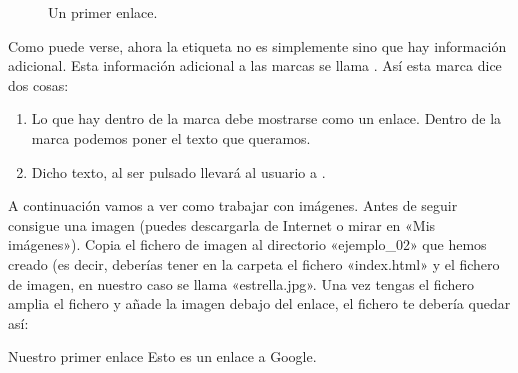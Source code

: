 \documentclass[a4paper,12pt,spanish]{sphinxmanual}
\begin{document}
\begin{figure}[htbp]
\centering
\capstart

\noindent{}
\caption{Un primer enlace.}\label{\detokenize{index:id14}}\end{figure}

Como puede verse, ahora la etiqueta no es simplemente  sino que hay información adicional. Esta información adicional a las marcas se llama . Así esta marca dice dos cosas:
\begin{enumerate}
\def\theenumi{\arabic{enumi}}
\def\labelenumi{\theenumi .}
\makeatletter\def\p@enumii{\p@enumi \theenumi .}\makeatother
\item {} 
Lo que hay dentro de la marca debe mostrarse como un enlace. Dentro de la marca podemos poner el texto que queramos.

\item {} 
Dicho texto, al ser pulsado llevará al usuario a .

\end{enumerate}

A continuación vamos a ver como trabajar con imágenes. Antes de seguir consigue una imagen (puedes descargarla de Internet o mirar en «Mis imágenes»). Copia el fichero de imagen al directorio «ejemplo\_02» que hemos creado (es decir, deberías tener en la carpeta el fichero «index.html» y el fichero de imagen, en nuestro caso se llama «estrella.jpg». Una vez tengas el fichero amplia el fichero y añade la imagen debajo del enlace, el fichero te debería quedar así:

%
\begin{sphinxVerbatim}[commandchars=\\\{\}]
    Nuestro primer enlace
     Esto es un enlace a Google.
       
\end{sphinxVerbatim}
\end{document}
